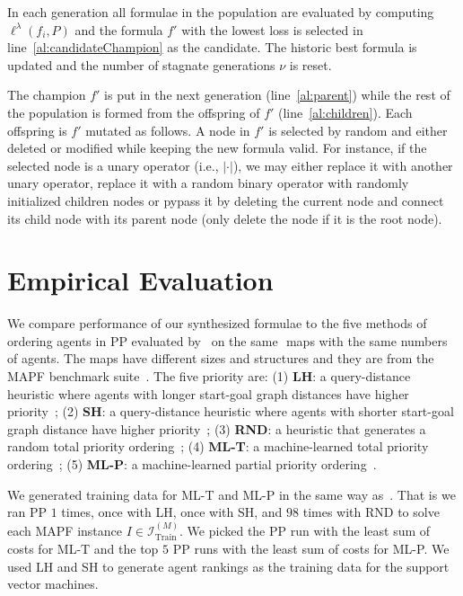 \documentclass[letterpaper]{article} %
\begin{document}
In each generation all formulae in the population are evaluated by computing $ \ell^{\lambda}(f_i, P) $ and the formula $ f' $ with the lowest loss is selected in line~\ref{al:candidateChampion} as the candidate. The historic best formula is updated and the number of stagnate generations $ \nu $ is reset.

The champion $ f' $ is put in the next generation (line~\ref{al:parent}) while the rest of the population is formed from the offspring of $ f' $ (line~\ref{al:children}). Each offspring is $ f' $ mutated as follows. A node in $ f' $ is selected by random and either deleted or modified while keeping the new formula valid. For instance, if the selected node is a unary operator (i.e., $ |\cdot| $), we may either replace it with another unary operator, replace it with a random binary operator with randomly initialized children nodes or pypass it by deleting the current node and connect its child node with its parent node (only delete the node if it is the root node).

\section{Empirical Evaluation}
\label{sec:empiricalEvaluation}

We compare performance of our synthesized formulae to the five methods of ordering agents in PP evaluated by~\citet{zhang222learning} on the same $  $ maps with the same numbers of agents. The maps have different sizes and structures and they are from the MAPF benchmark suite~\citep{stern219multi}. The five priority are: (1) \textbf{LH}: a query-distance heuristic where agents with longer start-goal graph distances have higher priority~\citep{van25prioritized}; (2) \textbf{SH}: a query-distance heuristic where agents with shorter start-goal graph distance have higher priority~\citep{ma219searching}; (3) \textbf{RND}: a heuristic that generates a random total priority ordering~\citep{bennewitz22finding}; (4) \textbf{ML-T}: a machine-learned total priority ordering~\citep{zhang222learning}; (5) \textbf{ML-P}: a machine-learned partial priority ordering~\citep{zhang222learning}.

We generated training data for ML-T and ML-P in the same way as~\citet{zhang222learning}. That is we ran PP $ 1 $ times, once with LH, once with SH, and $ 98 $ times with RND to solve each MAPF instance $ I \in \mathcal{I}^{(M)}_{\text{Train}} $. We picked the PP run with the least sum of costs for ML-T and the top $ 5 $ PP runs with the least sum of costs for ML-P. We used LH and SH to generate agent rankings as the training data for the support vector machines.
\end{document}
